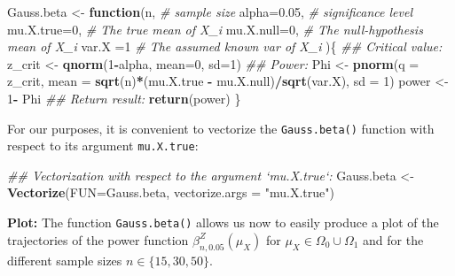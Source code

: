 \documentclass[]{book}
\newenvironment{Shaded}{\begin{snugshade}}{\end{snugshade}}
\newcommand{\CommentTok}[1]{\textcolor[rgb]{0.56,0.35,0.01}{\textit{#1}}}
\newcommand{\ControlFlowTok}[1]{\textcolor[rgb]{0.13,0.29,0.53}{\textbf{#1}}}
\newcommand{\DataTypeTok}[1]{\textcolor[rgb]{0.13,0.29,0.53}{#1}}
\newcommand{\DecValTok}[1]{\textcolor[rgb]{0.00,0.00,0.81}{#1}}
\newcommand{\FloatTok}[1]{\textcolor[rgb]{0.00,0.00,0.81}{#1}}
\newcommand{\KeywordTok}[1]{\textcolor[rgb]{0.13,0.29,0.53}{\textbf{#1}}}
\newcommand{\NormalTok}[1]{#1}
\newcommand{\OperatorTok}[1]{\textcolor[rgb]{0.81,0.36,0.00}{\textbf{#1}}}
\newcommand{\StringTok}[1]{\textcolor[rgb]{0.31,0.60,0.02}{#1}}
\theoremstyle{definition}
\theoremstyle{definition}
\theoremstyle{definition}
\theoremstyle{remark}
\begin{document}
\begin{Shaded}
\begin{Highlighting}[]
\NormalTok{Gauss.beta <-}\StringTok{ }\ControlFlowTok{function}\NormalTok{(n,             }\CommentTok{# sample size  }
                       \DataTypeTok{alpha=}\FloatTok{0.05}\NormalTok{,    }\CommentTok{# significance level}
                       \DataTypeTok{mu.X.true=}\DecValTok{0}\NormalTok{,   }\CommentTok{# The true mean of X_i }
                       \DataTypeTok{mu.X.null=}\DecValTok{0}\NormalTok{,   }\CommentTok{# The null-hypothesis mean of X_i}
                       \DataTypeTok{var.X    =}\DecValTok{1}    \CommentTok{# The assumed known var of X_i}
\NormalTok{                       )\{}
  \CommentTok{## Critical value:}
\NormalTok{  z_crit <-}\StringTok{ }\KeywordTok{qnorm}\NormalTok{(}\DecValTok{1}\OperatorTok{-}\NormalTok{alpha, }\DataTypeTok{mean=}\DecValTok{0}\NormalTok{, }\DataTypeTok{sd=}\DecValTok{1}\NormalTok{)}
  \CommentTok{## Power:}
\NormalTok{  Phi <-}\StringTok{ }\KeywordTok{pnorm}\NormalTok{(}\DataTypeTok{q    =}\NormalTok{ z_crit, }
               \DataTypeTok{mean =} \KeywordTok{sqrt}\NormalTok{(n)}\OperatorTok{*}\NormalTok{(mu.X.true }\OperatorTok{-}\StringTok{ }\NormalTok{mu.X.null)}\OperatorTok{/}\KeywordTok{sqrt}\NormalTok{(var.X), }
               \DataTypeTok{sd   =} \DecValTok{1}\NormalTok{)}
\NormalTok{  power <-}\StringTok{ }\DecValTok{1}\OperatorTok{-}\StringTok{ }\NormalTok{Phi}
  \CommentTok{## Return result:}
  \KeywordTok{return}\NormalTok{(power)}
\NormalTok{\}}
\end{Highlighting}
\end{Shaded}

For our purposes, it is convenient to vectorize the \texttt{Gauss.beta()} function with respect to its argument \texttt{mu.X.true}:

\begin{Shaded}
\begin{Highlighting}[]
\CommentTok{## Vectorization with respect to the argument `mu.X.true`:}
\NormalTok{Gauss.beta <-}\StringTok{ }\KeywordTok{Vectorize}\NormalTok{(}\DataTypeTok{FUN=}\NormalTok{Gauss.beta, }\DataTypeTok{vectorize.args =} \StringTok{"mu.X.true"}\NormalTok{)}
\end{Highlighting}
\end{Shaded}

\textbf{Plot:}
The function \texttt{Gauss.beta()} allows us now to easily produce a plot of the trajectories of the power function
\(\beta^{Z}_{n,0.05}(\mu_X)\) for \(\mu_X\in\Omega_0\cup\Omega_1\) and for the different sample sizes \(n\in\{15,30,50\}\).
\end{document}
